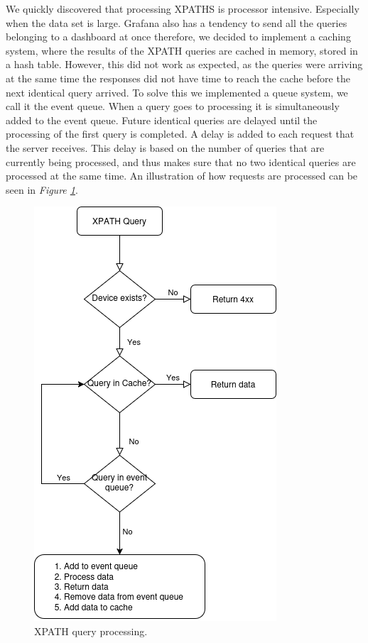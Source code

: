 \documentclass[12pt]{article}
\begin{document}
We quickly discovered that processing XPATHS is processor intensive. Especially when the data set is large.
Grafana also has a tendency to send all the queries belonging to a dashboard at once therefore, we decided 
to implement a caching system, where the results of the XPATH queries are cached in memory, stored in a hash table.
However, this did not work as expected, as the queries were arriving at the same time the responses did not 
have time to reach the cache before the next identical query arrived.
To solve this we implemented a queue system, we call it the event queue. 
When a query goes to processing it is simultaneously added to the event queue.
Future identical queries are delayed until the processing of the first query is completed.
A delay is added to each request that the server receives. This delay is based 
on the number of queries that are currently being processed, and thus makes
sure that no two identical queries are processed at the same time.
An illustration of how requests are processed can be seen in \textit{Figure \ref{fig:xpath-query}}.


\begin{figure}
  \centering
  \includegraphics{xpathquery.drawio.png}
  \caption{XPATH query processing.}
  \label{fig:xpath-query}
\end{figure}
\end{document}
